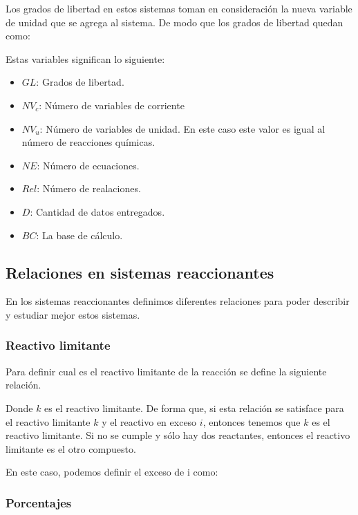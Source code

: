 Los grados de libertad en estos sistemas toman en consideración la nueva variable de unidad que se agrega al sistema. De modo que los grados de libertad quedan como:


Estas variables significan lo siguiente:
\begin{itemize}
    \item $GL$: Grados de libertad.
    \item $NV_c$: Número de variables de corriente
    \item $NV_u$: Número de variables de unidad. En este caso este valor es igual al número de reacciones químicas.
    \item $NE$: Número de ecuaciones.
    \item $Rel$: Número de realaciones.
    \item $D$: Cantidad de datos entregados.
    \item $BC$: La base de cálculo.
\end{itemize}

\subsection{Relaciones en sistemas reaccionantes}

En los sistemas reaccionantes definimos diferentes relaciones para poder describir y estudiar mejor estos sistemas.
\subsubsection{Reactivo limitante}

Para definir cual es el reactivo limitante de la reacción se define la siguiente relación.


Donde $k$ es el reactivo limitante. De forma que, si esta relación se satisface para el reactivo limitante $k$ y el reactivo en exceso $i$, entonces tenemos que $k$ es el reactivo limitante. Si no se cumple y sólo hay dos reactantes, entonces el reactivo limitante es el otro compuesto.

En este caso, podemos  definir el exceso de i como:


\subsubsection{Porcentajes}

